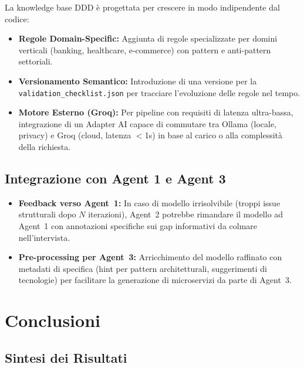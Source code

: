\documentclass[12pt,a4paper]{report}
\begin{document}
La knowledge base DDD è progettata per crescere in modo indipendente dal codice:
\begin{itemize}
  \item \textbf{Regole Domain-Specific:} Aggiunta di regole specializzate per
        domini verticali (banking, healthcare, e-commerce) con pattern e
        anti-pattern settoriali.
  \item \textbf{Versionamento Semantico:} Introduzione di una versione per la
        \texttt{validation\_checklist.json} per tracciare l'evoluzione delle
        regole nel tempo.
  \item \textbf{Motore Esterno (Groq):} Per pipeline con requisiti di latenza
        ultra-bassa, integrazione di un Adapter AI capace di commutare tra
        Ollama (locale, privacy) e Groq (cloud, latenza $<$1s) in base al carico
        o alla complessità della richiesta.
\end{itemize}

\section{Integrazione con Agent 1 e Agent 3}

\begin{itemize}
  \item \textbf{Feedback verso Agent~1:} In caso di modello irrisolvibile
        (troppi issue strutturali dopo $N$ iterazioni), Agent~2 potrebbe
        rimandare il modello ad Agent~1 con annotazioni specifiche sui gap
        informativi da colmare nell'intervista.

  \item \textbf{Pre-processing per Agent~3:} Arricchimento del modello raffinato
        con metadati di specifica (hint per pattern architetturali, suggerimenti
        di tecnologie) per facilitare la generazione di microservizi da parte
        di Agent~3.
\end{itemize}

\chapter{Conclusioni}

\section{Sintesi dei Risultati}
\end{document}
